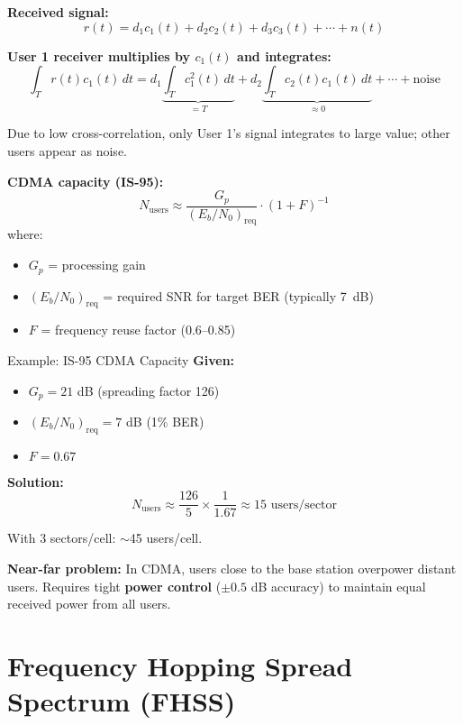 \textbf{Received signal:}
\begin{equation}
r(t) = d_1 c_1(t) + d_2 c_2(t) + d_3 c_3(t) + \cdots + n(t)
\end{equation}

\textbf{User 1 receiver multiplies by $c_1(t)$ and integrates:}
\begin{equation}
\int_T r(t) c_1(t)\, dt = d_1 \underbrace{\int_T c_1^2(t)\, dt}_{=T} + d_2 \underbrace{\int_T c_2(t) c_1(t)\, dt}_{\approx 0} + \cdots + \text{noise}
\end{equation}

Due to low cross-correlation, only User 1's signal integrates to large value; other users appear as noise.

\textbf{CDMA capacity (IS-95):}
\begin{equation}
N_{\mathrm{users}} \approx \frac{G_p}{(E_b/N_0)_{\mathrm{req}}} \cdot (1 + F)^{-1}
\end{equation}
where:
\begin{itemize}
\item $G_p$ = processing gain
\item $(E_b/N_0)_{\mathrm{req}}$ = required SNR for target BER (typically 7~dB)
\item $F$ = frequency reuse factor (0.6--0.85)
\end{itemize}

\begin{calloutbox}{Example: IS-95 CDMA Capacity}
\textbf{Given:}
\begin{itemize}
\item $G_p = 21$ dB (spreading factor 126)
\item $(E_b/N_0)_{\mathrm{req}} = 7$ dB (1\% BER)
\item $F = 0.67$
\end{itemize}

\textbf{Solution:}
$$N_{\mathrm{users}} \approx \frac{126}{5} \times \frac{1}{1.67} \approx 15 \text{ users/sector}$$

With 3 sectors/cell: $\sim$45 users/cell.
\end{calloutbox}

\begin{warningbox}
\textbf{Near-far problem:} In CDMA, users close to the base station overpower distant users. Requires tight \textbf{power control} ($\pm 0.5$ dB accuracy) to maintain equal received power from all users.
\end{warningbox}

\section{Frequency Hopping Spread Spectrum (FHSS)}

